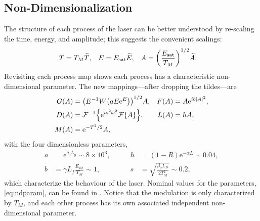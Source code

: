 \documentclass[10pt,twocolumn,a4paper]{article}
\let\originalleft\left
\let\originalright\right
\renewcommand{\left}{\mathopen{}\mathclose\bgroup\originalleft}
\renewcommand{\right}{\aftergroup\egroup\originalright}
\newcommand{\Es}{E_{\textrm{sat}}}
\newcommand{\FT}[1]{\mathcal{F}\left\{ #1 \right\}}
\newcommand{\FTi}[1]{\mathcal{F}^{-1}\left\{ #1 \right\}}
\begin{document}
\subsection{Non-Dimensionalization}
The structure of each process of the laser can be better understood by re-scaling the time, energy, and amplitude; this suggests the convenient scalings:
\begin{align}
	T &= T_M \widetilde{T},& E &= \Es \widetilde{E},& A &= \left( \frac{\Es}{T_M} \right)^{1/2} \widetilde{A}.
\end{align}
Revisiting each process map shows each process has a characteristic non-dimensional parameter. The new mappings---after dropping the tildes---are
\begin{equation}
	\begin{aligned}
		G(A) &= \left(E^{-1} W \left( a E \textrm{e}^{E}\right) \right)^{1/2} A, & F(A) &= A \textrm{e}^{i b |A|^2}, \\
		D(A) &= \FTi{\textrm{e}^{i s^2 \omega^2} \FT{A}}, & L(A) &= h A, \\
		M(A) &= \textrm{e}^{-T^2 / 2} A,
		\label{eq:effects}
	\end{aligned}
\end{equation}
with the four dimensionless parameters,
\begin{equation}
	\begin{aligned}
		a &= \textrm{e}^{g_0 L_g} \sim 8 \times 10^3,& \qquad h &= (1 - R) \textrm{e}^{-\alpha L} \sim 0.04, \\
		b &= \gamma L_f \frac{\Es}{T_M} \sim 1,& \qquad s &= \sqrt{\frac{\beta_2 L_D}{2 T_M^2}} \sim 0.2,
		\label{eq:ndparam}
	\end{aligned}
\end{equation}
which characterize the behaviour of the laser. Nominal values for the parameters, \eqref{eq:ndparam}, can be found in \cite{agrawal2002, agrawal2013, bohun, burgoyne2014, burgoyneemail, finot, li, litchinitser, peng, shtyrina, tamura1993, tamura1996, tomlinson, usechak, yamashita, yarutkina}. Notice that the modulation is only characterized by $T_M$, and each other process has its own associated independent non-dimensional parameter.
\end{document}
